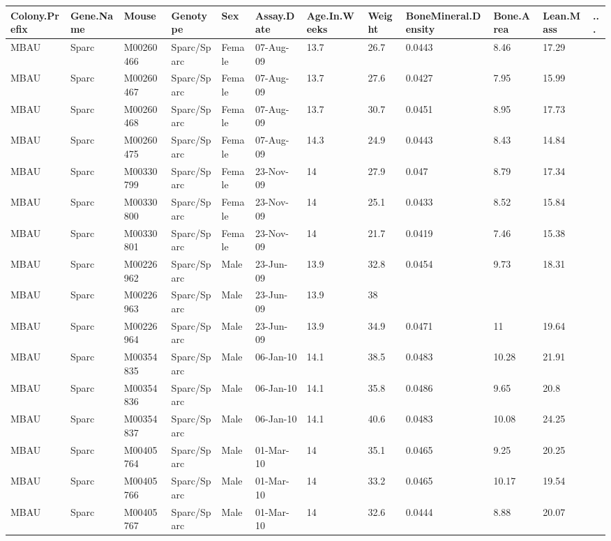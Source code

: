 \documentclass[12pt,a4paper]{article}
\begin{document}
\begin{table}
 \begin{tabular}{| p{13mm} | p{13mm} | l | l | l | p{19mm}| p{12mm} | l | p{13mm} | p{12mm} | p{12mm} | l |}
  \hline
Colony.\newline Prefix&Gene.\newline Name&Mouse&\textbf{Genotype}&\textbf{Sex}&\textbf{Assay.\newline Date}&Age.In.\newline Weeks&\textbf{Weight}&Bone\newline Mineral.\newline Density&Bone.\newline Area&Lean.\newline Mass& ... \\\hline
MBAU&Sparc&M00260466&Sparc/Sparc&Female&07-Aug-09&13.7&26.7&0.0443&8.46&17.29&\\
MBAU&Sparc&M00260467&Sparc/Sparc&Female&07-Aug-09&13.7&27.6&0.0427&7.95&15.99&\\
MBAU&Sparc&M00260468&Sparc/Sparc&Female&07-Aug-09&13.7&30.7&0.0451&8.95&17.73&\\
MBAU&Sparc&M00260475&Sparc/Sparc&Female&07-Aug-09&14.3&24.9&0.0443&8.43&14.84&\\
MBAU&Sparc&M00330799&Sparc/Sparc&Female&23-Nov-09&14&27.9&0.047&8.79&17.34&\\
MBAU&Sparc&M00330800&Sparc/Sparc&Female&23-Nov-09&14&25.1&0.0433&8.52&15.84&\\
MBAU&Sparc&M00330801&Sparc/Sparc&Female&23-Nov-09&14&21.7&0.0419&7.46&15.38&\\
MBAU&Sparc&M00226962&Sparc/Sparc&Male&23-Jun-09&13.9&32.8&0.0454&9.73&18.31&\\
MBAU&Sparc&M00226963&Sparc/Sparc&Male&23-Jun-09&13.9&38&&&&\\
MBAU&Sparc&M00226964&Sparc/Sparc&Male&23-Jun-09&13.9&34.9&0.0471&11&19.64&\\
MBAU&Sparc&M00354835&Sparc/Sparc&Male&06-Jan-10&14.1&38.5&0.0483&10.28&21.91&\\
MBAU&Sparc&M00354836&Sparc/Sparc&Male&06-Jan-10&14.1&35.8&0.0486&9.65&20.8&\\
MBAU&Sparc&M00354837&Sparc/Sparc&Male&06-Jan-10&14.1&40.6&0.0483&10.08&24.25&\\
MBAU&Sparc&M00405764&Sparc/Sparc&Male&01-Mar-10&14&35.1&0.0465&9.25&20.25&\\
MBAU&Sparc&M00405766&Sparc/Sparc&Male&01-Mar-10&14&33.2&0.0465&10.17&19.54&\\
MBAU&Sparc&M00405767&Sparc/Sparc&Male&01-Mar-10&14&32.6&0.0444&8.88&20.07&\\

\end{tabular}
\end{table}
\end{document}
